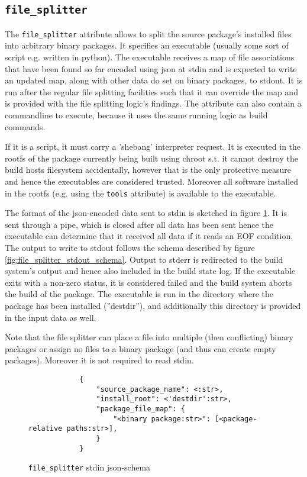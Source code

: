 \documentclass[a4paper]{scrartcl}
\begin{document}
	\subsection{\texttt{file\_splitter}}
	\label{sec:file_splitter}
	
	The \texttt{file\_splitter} attribute allows to split the source package's installed files into arbitrary binary packages. It specifies an executable (usually some sort of script e.g. written in python). The executable receives a map of file associations that have been found so far encoded using json at stdin and is expected to write an updated map, along with other data do set on binary packages, to stdout. It is run after the regular file splitting facilities such that it can override the map and is provided with the file splitting logic's findings. The attribute can also contain a commandline to execute, because it uses the same running logic as build commands.
	
	If it is a script, it must carry a 'shebang' interpreter request. It is executed in the rootfs of the package currently being built using chroot s.t. it cannot destroy the build hosts filesystem accidentally, however that is the only protective measure and hence the executables are considered trusted. Moreover all software installed in the rootfs (e.g. using the \texttt{tools} attribute) is available to the executable.
	
	The format of the json-encoded data sent to stdin is sketched in figure \ref{fig:file_splitter_stdin_schema}. It is sent through a pipe, which is closed after all data has been sent hence the executable can determine that it received all data if it reads an EOF condition. The output to write to stdout follows the schema described by figure \ref{fig:file_splitter_stdout_schema}. Output to stderr is redirected to the build system's output and hence also included in the build state log. If the executable exits with a non-zero status, it is considered failed and the build system aborts the build of the package. The executable is run in the directory where the package has been installed (''destdir''), and additionally this directory is provided in the input data as well.
	
	Note that the file splitter can place a file into multiple (then conflicting) binary packages or assign no files to a binary package (and thus can create empty packages). Moreover it is not required to read stdin.
	
	\begin{figure}[htp]
		\centering
		
		\begin{minipage}{0.8\textwidth}
			\begin{lstlisting}
			{
				"source_package_name": <:str>,
				"install_root": <'destdir':str>,
				"package_file_map": {
					"<binary package:str>": [<package-relative paths:str>],
				}
			}
			\end{lstlisting}
		\end{minipage}
		
		\caption{\texttt{file\_splitter} stdin json-schema}
		\label{fig:file_splitter_stdin_schema}
	\end{figure}
\end{document}

